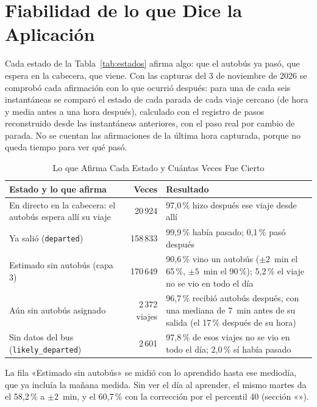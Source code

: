 \section{Fiabilidad de lo que Dice la Aplicación}
\label{sec:fiabilidad-estados}

Cada estado de la Tabla~\ref{tab:estados} afirma algo: que el autobús ya pasó, que espera en la cabecera, que viene. Con
las capturas del 3 de noviembre de 2026 se comprobó cada afirmación con lo que ocurrió después: para una de cada seis
instantáneas se comparó el estado de cada parada de cada viaje cercano (de hora y media antes a una hora después),
calculado con el registro de pasos reconstruido desde las instantáneas anteriores, con el paso real por cambio de
parada. No se cuentan las afirmaciones de la última hora capturada, porque no queda tiempo para ver qué pasó.

\begin{table}[ht]
\centering
\caption{Lo que Afirma Cada Estado y Cuántas Veces Fue Cierto}\label{tab:fiabilidad}
\begin{tabularx}{\textwidth}{@{}>{\raggedright\arraybackslash}p{}rX@{}}
\toprule
Estado y lo que afirma & Veces & Resultado\\
\midrule
En directo en la cabecera: el autobús espera allí su viaje & 20\,924 & 97{,}0\,\% hizo después ese viaje desde allí\\
Ya salió (\texttt{departed}) & 158\,833 & 99{,}9\,\% había pasado; 0{,}1\,\% pasó después\\
Estimado sin autobús (capa 3) & 170\,649 & 90{,}6\,\% vino un autobús ($\pm2$~min el 65\,\%, $\pm5$~min el 90\,\%); 5{,}2\,\% el viaje no se vio en todo el día\\
Aún sin autobús asignado & 2\,372 viajes & 96{,}7\,\% recibió autobús después, con una mediana de 7~min antes de su salida (el 17\,\% después de su hora)\\
Sin datos del bus (\texttt{likely\_departed}) & 2\,601 & 97{,}8\,\% de esos viajes no se vio en todo el día; 2{,}0\,\% sí había pasado\\
\bottomrule
\end{tabularx}
\end{table}

La fila «Estimado sin autobús» se midió con lo aprendido hasta ese mediodía, que ya incluía la mañana medida. Sin ver
el día al aprender, el mismo martes da el 58,2\,\% a $\pm2$~min, y el 60,7\,\% con la corrección por el percentil
40 (sección «»).

